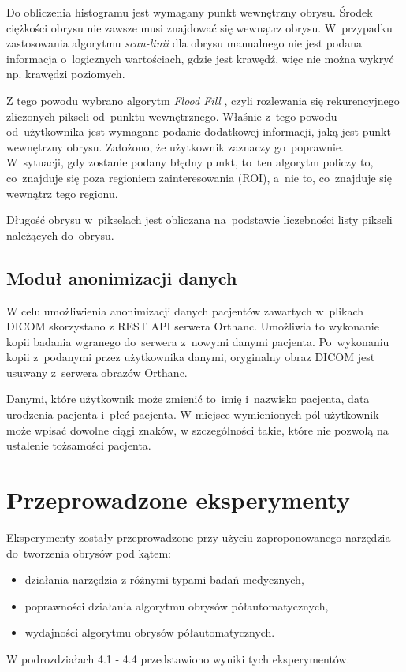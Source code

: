 \documentclass[a4paper,11pt,twoside,openright]{report}
\newcommand\blankpage{%
    \null
    \thispagestyle{empty}%
    \newpage}
\theoremstyle{definition}
\begin{document}
Do obliczenia histogramu jest wymagany punkt wewnętrzny obrysu. Środek ciężkości
obrysu nie zawsze musi znajdować się wewnątrz obrysu. W~przypadku zastosowania
algorytmu \textit{scan-linii} \cite{GK1} dla obrysu manualnego nie jest podana informacja o~logicznych
wartościach, gdzie jest krawędź, więc nie można wykryć np. krawędzi poziomych.

Z tego powodu wybrano algorytm \textit{Flood Fill} \cite{AiSD2}, czyli rozlewania się rekurencyjnego %
zliczonych pikseli od~punktu wewnętrznego. Właśnie z~tego powodu od~użytkownika
jest wymagane podanie dodatkowej informacji, jaką jest punkt wewnętrzny obrysu.
Założono, że użytkownik zaznaczy go~poprawnie. W~sytuacji, gdy zostanie podany
błędny punkt, to~ten algorytm policzy to, co~znajduje się poza regioniem zainteresowania (ROI),
a~nie to, co~znajduje się wewnątrz tego regionu.

Długość obrysu w~pikselach jest obliczana na~podstawie liczebności listy pikseli należących do~obrysu.

\section {Moduł anonimizacji danych}

W celu umożliwienia anonimizacji danych pacjentów zawartych w~plikach DICOM skorzystano
z REST API serwera Orthanc. Umożliwia to wykonanie kopii badania wgranego do~serwera
z~nowymi danymi pacjenta. Po~wykonaniu kopii z~podanymi przez użytkownika danymi,
oryginalny obraz DICOM jest usuwany z~serwera obrazów Orthanc.

Danymi, które użytkownik może zmienić to~imię i~nazwisko pacjenta, data urodzenia pacjenta
i~płeć pacjenta. W miejsce wymienionych pól użytkownik może wpisać dowolne ciągi
znaków, w szczególności takie, które nie pozwolą na ustalenie tożsamości pacjenta.

\afterpage{\blankpage}

\chapter {Przeprowadzone eksperymenty}

Eksperymenty zostały przeprowadzone przy użyciu zaproponowanego narzędzia
do~tworzenia obrysów pod kątem:
\begin{itemize}[noitemsep]
\item działania narzędzia z różnymi typami badań medycznych,
\item poprawności działania algorytmu obrysów półautomatycznych,
\item wydajności algorytmu obrysów półautomatycznych.
\end{itemize}
W podrozdziałach 4.1 - 4.4 przedstawiono wyniki tych eksperymentów.
\end{document}
